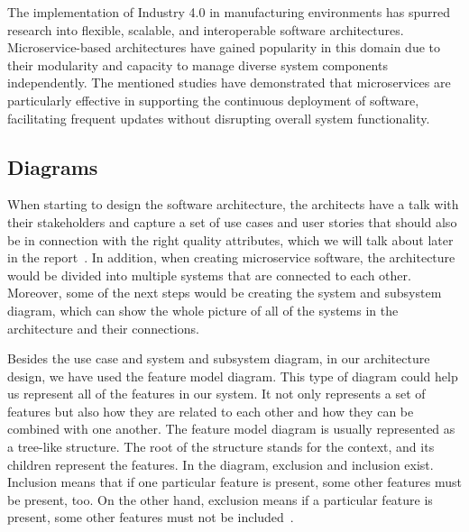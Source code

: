 \documentclass[conference]{IEEEtran}
\begin{document}

\color{black}

The implementation of Industry 4.0 in manufacturing environments has spurred research into flexible, scalable, and interoperable software architectures. Microservice-based architectures have gained popularity in this domain due to their modularity and capacity to manage diverse system components independently. The mentioned studies have demonstrated that microservices are particularly effective in supporting the continuous deployment of software, facilitating frequent updates without disrupting overall system functionality. 


\subsection{Diagrams}
When starting to design the software architecture, the architects have a talk with their stakeholders and capture a set of use cases and user stories that should also be in connection with the right quality attributes, which we will talk about later in the report~\cite{b1}. In addition, when creating microservice software, the architecture would be divided into multiple systems that are connected to each other. Moreover, some of the next steps would be creating the system and subsystem diagram, which can show the whole picture of all of the systems in the architecture and their connections.

Besides the use case and system and subsystem diagram, in our architecture design, we have used the feature model diagram. This type of diagram could help us represent all of the features in our system. It not only represents a set of features but also how they are related to each other and how they can be combined with one another. The feature model diagram is usually represented as a tree-like structure. The root of the structure stands for the context, and its children represent the features. In the diagram, exclusion and inclusion exist. Inclusion means that if one particular feature is present, some other features must be present, too. On the other hand, exclusion means if a particular feature is present, some other features must not be included~\cite{b3}. 
\end{document}
